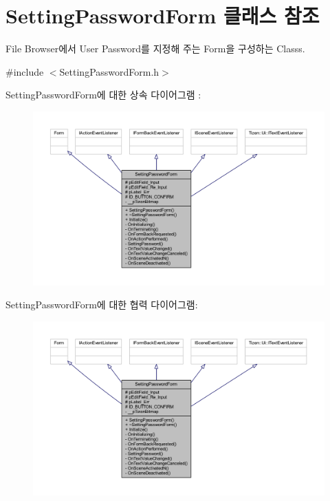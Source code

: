 \hypertarget{class_setting_password_form}{\section{Setting\+Password\+Form 클래스 참조}
\label{class_setting_password_form}
}


File Browser에서 User Password를 지정해 주는 Form을 구성하는 Classs.  




{\ttfamily \#include $<$Setting\+Password\+Form.\+h$>$}



Setting\+Password\+Form에 대한 상속 다이어그램 \+: 
\nopagebreak
\begin{figure}[H]
\begin{center}
\leavevmode
\includegraphics[width=350pt]{class_setting_password_form__inherit__graph}
\end{center}
\end{figure}


Setting\+Password\+Form에 대한 협력 다이어그램\+:
\nopagebreak
\begin{figure}[H]
\begin{center}
\leavevmode
\includegraphics[width=350pt]{class_setting_password_form__coll__graph}
\end{center}
\end{figure}
